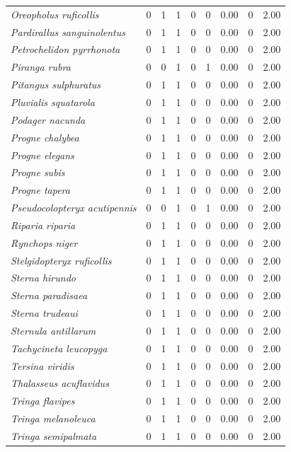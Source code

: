 \documentclass[
  oneside]{scrbook}
\begin{document}
\begin{longtable}{>{}lrrrrrrrr}
\em{Oreopholus ruficollis} & 0 & 1 & 1 & 0 & 0 & 0.00 & 0 & 2.00\\
\em{Pardirallus sanguinolentus} & 0 & 1 & 1 & 0 & 0 & 0.00 & 0 & 2.00\\
\em{Petrochelidon pyrrhonota} & 0 & 1 & 1 & 0 & 0 & 0.00 & 0 & 2.00\\
\em{Piranga rubra} & 0 & 0 & 1 & 0 & 1 & 0.00 & 0 & 2.00\\
\addlinespace
\em{Pitangus sulphuratus} & 0 & 1 & 1 & 0 & 0 & 0.00 & 0 & 2.00\\
\em{Pluvialis squatarola} & 0 & 1 & 1 & 0 & 0 & 0.00 & 0 & 2.00\\
\em{Podager nacunda} & 0 & 1 & 1 & 0 & 0 & 0.00 & 0 & 2.00\\
\em{Progne chalybea} & 0 & 1 & 1 & 0 & 0 & 0.00 & 0 & 2.00\\
\em{Progne elegans} & 0 & 1 & 1 & 0 & 0 & 0.00 & 0 & 2.00\\
\addlinespace
\em{Progne subis} & 0 & 1 & 1 & 0 & 0 & 0.00 & 0 & 2.00\\
\em{Progne tapera} & 0 & 1 & 1 & 0 & 0 & 0.00 & 0 & 2.00\\
\em{Pseudocolopteryx acutipennis} & 0 & 0 & 1 & 0 & 1 & 0.00 & 0 & 2.00\\
\em{Riparia riparia} & 0 & 1 & 1 & 0 & 0 & 0.00 & 0 & 2.00\\
\em{Rynchops niger} & 0 & 1 & 1 & 0 & 0 & 0.00 & 0 & 2.00\\
\addlinespace
\em{Stelgidopteryx ruficollis} & 0 & 1 & 1 & 0 & 0 & 0.00 & 0 & 2.00\\
\em{Sterna hirundo} & 0 & 1 & 1 & 0 & 0 & 0.00 & 0 & 2.00\\
\em{Sterna paradisaea} & 0 & 1 & 1 & 0 & 0 & 0.00 & 0 & 2.00\\
\em{Sterna trudeaui} & 0 & 1 & 1 & 0 & 0 & 0.00 & 0 & 2.00\\
\em{Sternula antillarum} & 0 & 1 & 1 & 0 & 0 & 0.00 & 0 & 2.00\\
\addlinespace
\em{Tachycineta leucopyga} & 0 & 1 & 1 & 0 & 0 & 0.00 & 0 & 2.00\\
\em{Tersina viridis} & 0 & 1 & 1 & 0 & 0 & 0.00 & 0 & 2.00\\
\em{Thalasseus acuflavidus} & 0 & 1 & 1 & 0 & 0 & 0.00 & 0 & 2.00\\
\em{Tringa flavipes} & 0 & 1 & 1 & 0 & 0 & 0.00 & 0 & 2.00\\
\em{Tringa melanoleuca} & 0 & 1 & 1 & 0 & 0 & 0.00 & 0 & 2.00\\
\addlinespace
\em{Tringa semipalmata} & 0 & 1 & 1 & 0 & 0 & 0.00 & 0 & 2.00\\

\end{longtable}
\end{document}
